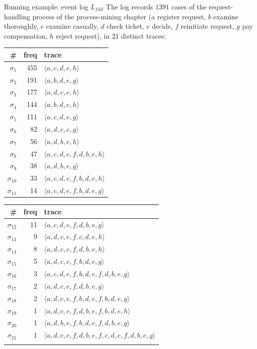 \begin{examplebox}{Running example: event log $L_{full}$}
The log records $1391$ cases of the request-handling process of the process-mining chapter ($a$ register request, $b$ examine thoroughly, $c$ examine casually, $d$ check ticket, $e$ decide, $f$ reinitiate request, $g$ pay compensation, $h$ reject request), in $21$ distinct traces:
\begin{center}
\scriptsize
\begin{tabular}{rrl}
\toprule
\# & freq & trace \\
\midrule
$\sigma_1$ & 455 & $\langle a,c,d,e,h\rangle$ \\
$\sigma_2$ & 191 & $\langle a,b,d,e,g\rangle$ \\
$\sigma_3$ & 177 & $\langle a,d,c,e,h\rangle$ \\
$\sigma_4$ & 144 & $\langle a,b,d,e,h\rangle$ \\
$\sigma_5$ & 111 & $\langle a,c,d,e,g\rangle$ \\
$\sigma_6$ & 82 & $\langle a,d,c,e,g\rangle$ \\
$\sigma_7$ & 56 & $\langle a,d,b,e,h\rangle$ \\
$\sigma_8$ & 47 & $\langle a,c,d,e,f,d,b,e,h\rangle$ \\
$\sigma_9$ & 38 & $\langle a,d,b,e,g\rangle$ \\
$\sigma_{10}$ & 33 & $\langle a,c,d,e,f,b,d,e,h\rangle$ \\
$\sigma_{11}$ & 14 & $\langle a,c,d,e,f,b,d,e,g\rangle$ \\
\bottomrule
\end{tabular}
\quad
\begin{tabular}{rrl}
\toprule
\# & freq & trace \\
\midrule
$\sigma_{12}$ & 11 & $\langle a,c,d,e,f,d,b,e,g\rangle$ \\
$\sigma_{13}$ & 9 & $\langle a,d,c,e,f,c,d,e,h\rangle$ \\
$\sigma_{14}$ & 8 & $\langle a,d,c,e,f,d,b,e,h\rangle$ \\
$\sigma_{15}$ & 5 & $\langle a,d,c,e,f,b,d,e,g\rangle$ \\
$\sigma_{16}$ & 3 & $\langle a,c,d,e,f,b,d,e,f,d,b,e,g\rangle$ \\
$\sigma_{17}$ & 2 & $\langle a,d,c,e,f,d,b,e,g\rangle$ \\
$\sigma_{18}$ & 2 & $\langle a,d,c,e,f,b,d,e,f,b,d,e,g\rangle$ \\
$\sigma_{19}$ & 1 & $\langle a,d,c,e,f,d,b,e,f,b,d,e,h\rangle$ \\
$\sigma_{20}$ & 1 & $\langle a,d,b,e,f,b,d,e,f,d,b,e,g\rangle$ \\
$\sigma_{21}$ & 1 & $\langle a,d,c,e,f,d,b,e,f,c,d,e,f,d,b,e,g\rangle$ \\
& & \\
\bottomrule
\end{tabular}
\end{center}
\end{examplebox}

